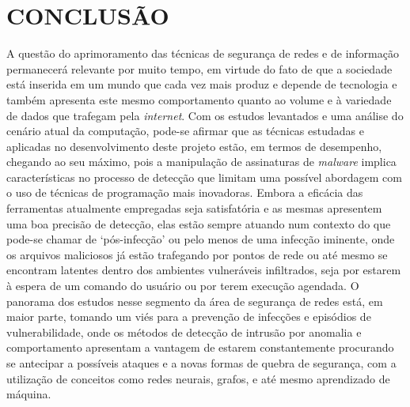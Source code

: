 \chapter{CONCLUSÃO}
\label{c.conclusao}

A questão do aprimoramento das técnicas de segurança de redes e de informação
permanecerá relevante por muito tempo, em virtude do fato de que a sociedade
está inserida em um mundo que cada vez mais produz e depende de tecnologia e também
apresenta este mesmo comportamento quanto ao volume e à variedade de dados que
trafegam pela \textit{internet}. Com os estudos levantados e uma análise do
cenário atual da computação, pode-se afirmar que as técnicas estudadas e
aplicadas no desenvolvimento deste projeto estão, em termos de desempenho,
chegando ao seu máximo, pois a manipulação de assinaturas de \textit{malware}
implica características no processo de detecção que limitam uma possível
abordagem com o uso de técnicas de programação mais inovadoras. Embora a
eficácia das ferramentas atualmente empregadas seja satisfatória e as mesmas
apresentem uma boa precisão de detecção, elas estão sempre atuando num contexto do
que pode-se chamar de `pós-infecção' ou pelo menos de uma infecção iminente,
onde os arquivos maliciosos já estão trafegando por pontos de rede ou até mesmo se encontram
latentes dentro dos ambientes vulneráveis infiltrados, seja por estarem à espera de um
comando do usuário ou por terem execução agendada. O panorama dos estudos nesse
segmento da área de segurança de redes está, em maior parte, tomando um viés
para a prevenção de infecções e episódios de vulnerabilidade, onde os métodos de
detecção de intrusão por anomalia e comportamento apresentam a vantagem de
estarem constantemente procurando se antecipar a possíveis ataques e a novas
formas de quebra de segurança, com a utilização de conceitos como redes neurais,
grafos, e até mesmo aprendizado de máquina.

